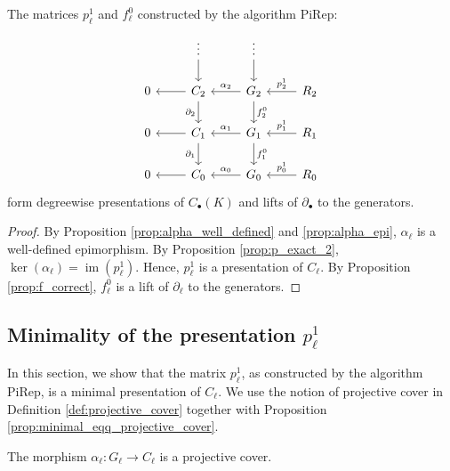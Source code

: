 \documentclass[english,a4paper,nolineno,cleveref]{socg-lipics-v2021}
\DeclareMathOperator{\im}{im}
\begin{document}
\begin{theorem} \label{thm:correct_presentation}
The matrices $p^1_\ell$ and $f^0_\ell$ constructed by the algorithm {\sc PiRep}: 
\begin{equation*}
\begin{tikzcd}
& \vdots \arrow[d] & \vdots \arrow[d] &  \\
0 & C_2 \arrow[d,swap,"\partial_2"] \arrow[l] & G_2 \arrow[l,swap,"\alpha_2"] \arrow[d,"f^0_2"] & R_2 \arrow[l,swap,"p_2^1"] \\
0 & C_1 \arrow[l]  \arrow[d,swap,"\partial_1"] & G_1 \arrow[l,swap,"\alpha_1"] \arrow[d,"f^0_1"] & R_1 \arrow[l,swap,"p_1^1"] \\
0 & C_0 \arrow[l] & G_0 \arrow[l,swap,"\alpha_0"] & R_0 \arrow[l,swap,"p_0^1"]
\end{tikzcd}
\end{equation*}
form degreewise presentations of $C_\bullet(K)$ and lifts of $\partial_\bullet$ to the generators.
\end{theorem}

\begin{proof}
By Proposition \ref{prop:alpha_well_defined} and \ref{prop:alpha_epi}, $\alpha_\ell$ is a well-defined epimorphism. By Proposition \ref{prop:p_exact_2}, $\ker(\alpha_\ell)=\im(p_\ell^1)$. Hence, $p_\ell^1$ is a presentation of $C_\ell$. By Proposition \ref{prop:f_correct}, $f^0_\ell$ is a lift of $\partial_\ell$ to the generators.    
\end{proof}

\subsection{Minimality of the presentation $p_\ell^1$}
\label{sec:p1minimality}
In this section, we show that the matrix $p_\ell^1$, as constructed by the algorithm {\sc PiRep}, is a minimal presentation of $C_\ell$. We use the notion of projective cover in Definition \ref{def:projective_cover} together with Proposition \ref{prop:minimal_eqq_projective_cover}.

\begin{proposition} \label{prop:alpha_proj_cover}
The morphism $\alpha_\ell\colon G_\ell\rightarrow C_\ell$ is a projective cover.    
\end{proposition}
\end{document}
